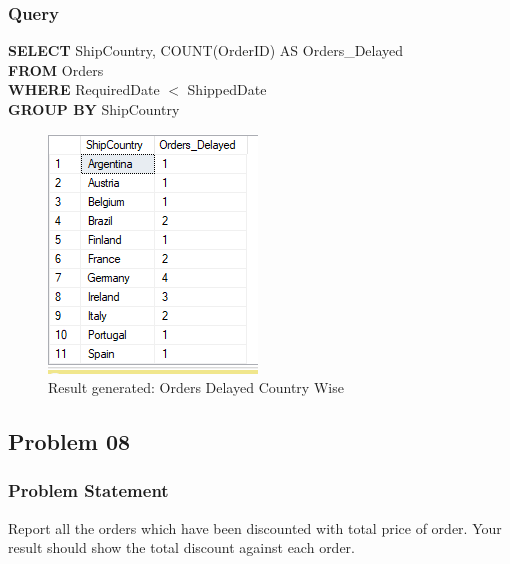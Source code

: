 \documentclass[12pt,a4paper]{report}
\begin{document}
\subsubsection{Query}
\begin{center}
	\begin{minipage}{12cm}
		\textbf{SELECT} ShipCountry, COUNT(OrderID) AS Orders\_Delayed\\
		\textbf{FROM} Orders\\
		\textbf{WHERE} RequiredDate $<$ ShippedDate\\
		\textbf{GROUP BY} ShipCountry
	\end{minipage}
	\begin{figure}[h]
	\centering
		\includegraphics[scale=0.7]{images/12.png}
		\caption{Result generated: Orders Delayed Country Wise}
	\end{figure}
\end{center}

\subsection{Problem 08}
\subsubsection{Problem Statement}
Report all the orders which have been discounted with total price of order. Your result should show the 
total discount against each order.
\end{document}

